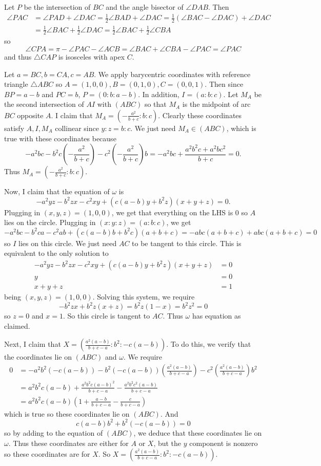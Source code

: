 Let $P$ be the intersection of $BC$ and the angle bisector of $\angle{DAB}$. Then
\begin{align*}
	\angle{PAC}&=\angle{PAD}+\angle{DAC}=\frac{1}{2}\angle{BAD}+\angle{DAC}=\frac{1}{2}\left(\angle{BAC}-\angle{DAC}\right)+\angle{DAC}\\
	&=\frac{1}{2}\angle{BAC}+\frac{1}{2}\angle{DAC}=\frac{1}{2}\angle{BAC}+\frac{1}{2}\angle{CBA}
\end{align*}
so \[\angle{CPA}=\pi-\angle{PAC}-\angle{ACB}=\angle{BAC}+\angle{CBA}-\angle{PAC}=\angle{PAC}\] and thus $\triangle{CAP}$ is isosceles with apex $C$.

Let $a=BC,b=CA,c=AB$. We apply barycentric coordinates with reference triangle $\triangle{ABC}$ so $A=(1,0,0),B=(0,1,0),C=(0,0,1)$. Then since $BP=a-b$ and $PC=b$, $P=(0:b:a-b)$. In addition, $I=(a:b:c)$. Let $M_A$ be the second intersection of $AI$ with $(ABC)$ so that $M_A$ is the midpoint of arc $BC$ opposite $A$. I claim that $M_A=\left(-\frac{a^2}{b+c}:b:c\right)$. Clearly these coordinates satisfy $A,I,M_A$ collinear since $y:z=b:c$. We just need $M_A\in(ABC)$, which is true with these coordinates because \[-a^2bc-b^2c\left(-\frac{a^2}{b+c}\right)-c^2\left(-\frac{a^2}{b+c}\right)b=-a^2bc+\frac{a^2b^2c+a^2bc^2}{b+c}=0.\] Thus $M_A=\left(-\frac{a^2}{b+c}:b:c\right)$.

Now, I claim that the equation of $\omega$ is \[-a^2yz-b^2zx-c^2xy+(c(a-b)y+b^2z)(x+y+z)=0.\] Plugging in $(x,y,z)=(1,0,0)$, we get that everything on the LHS is $0$ so $A$ lies on the circle. Plugging in $(x:y:z)=(a:b:c)$, we get \[-a^2bc-b^2ca-c^2ab+(c(a-b)b+b^2c)(a+b+c)=-abc(a+b+c)+abc(a+b+c)=0\] so $I$ lies on this circle. We just need $AC$ to be tangent to this circle. This is equivalent to the only solution to
\begin{align*}
	-a^2yz-b^2zx-c^2xy+(c(a-b)y+b^2z)(x+y+z)&=0\\
	y&=0\\
	x+y+z&=1
\end{align*}
being $(x,y,z)=(1,0,0)$. Solving this system, we require \[-b^2zx+b^2z(x+z)=b^2z(1-x)=b^2z^2=0\] so $z=0$ and $x=1$. So this circle is tangent to $AC$. Thus $\omega$ has equation as claimed.

Next, I claim that $X=\left(\frac{a^2(a-b)}{b+c-a}:b^2:-c(a-b)\right)$. To do this, we verify that the coordinates lie on $(ABC)$ and $\omega$. We require
\begin{align*}
	0&=-a^2b^2(-c(a-b))-b^2(-c(a-b))\left(\frac{a^2(a-b)}{b+c-a}\right)-c^2\left(\frac{a^2(a-b)}{b+c-a}\right)b^2\\
	&=a^2b^2c(a-b)+\frac{a^2b^2c(a-b)^2}{b+c-a}-\frac{a^2b^2c^2(a-b)}{b+c-a}\\
	&=a^2b^2c(a-b)\left(1+\frac{a-b}{b+c-a}-\frac{c}{b+c-a}\right)
\end{align*}
which is true so these coordinates lie on $(ABC)$. And \[c(a-b)b^2+b^2(-c(a-b))=0\] so by adding to the equation of $(ABC)$, we deduce that these coordinates lie on $\omega$. Thus these coordinates are either for $A$ or $X$, but the $y$ component is nonzero so these coordinates are for $X$. So $X=\left(\frac{a^2(a-b)}{b+c-a}:b^2:-c(a-b)\right)$.

